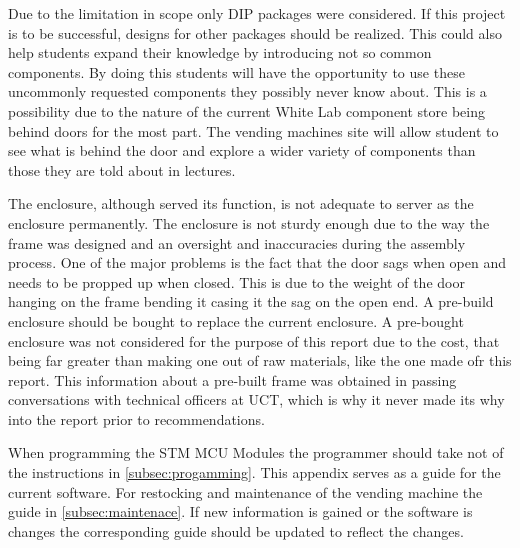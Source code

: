 \documentclass[a4paper,11pt]{article}
\numberwithin{figure}{section}
\numberwithin{table}{section}
\begin{document}

Due to the limitation in scope only DIP packages were considered. If this project is to be successful, designs for other packages should be realized. This could also help students expand their knowledge by introducing not so common components. By doing this students will have the opportunity to use these uncommonly requested components they possibly never know about. This is a possibility due to the nature of the current White Lab component store being behind doors for the most part. The vending machines site will allow student to see what is behind the door and explore a wider variety of components than those they are told about in lectures.

The enclosure, although served its function, is not adequate to server as the enclosure permanently. The enclosure is not sturdy enough due to the way the frame was designed and an oversight and inaccuracies during the assembly process. One of the major problems is the fact that the door sags when open and needs to be propped up when closed. This is due to the weight of the door hanging on the frame bending it casing it the sag on the open end. A pre-build enclosure should be bought to replace the current enclosure. A pre-bought enclosure was not considered for the purpose of this report due to the cost, that being far greater than making one out of raw materials, like the one made ofr this report. This information about a pre-built frame was obtained in passing conversations with technical officers at UCT, which is why it never made its why into the report prior to recommendations.

When programming the STM MCU Modules the programmer should take not of the instructions in \autoref{subsec:progamming}. This appendix serves as a guide for the current software. For restocking and maintenance of the vending machine the guide in \autoref{subsec:maintenace}. If new information is gained or the software is changes the corresponding guide should be updated to reflect the changes.
\end{document}
